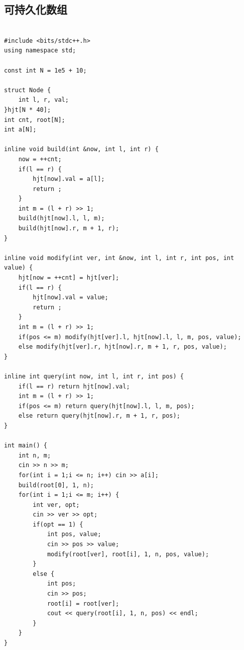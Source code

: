 \documentclass[twoside]{article}
\begin{document}
\subsection{可持久化数组}
\begin{lstlisting}

#include <bits/stdc++.h>
using namespace std;

const int N = 1e5 + 10;

struct Node {
    int l, r, val;
}hjt[N * 40];
int cnt, root[N];
int a[N];

inline void build(int &now, int l, int r) {
    now = ++cnt;
    if(l == r) {
        hjt[now].val = a[l];
        return ;
    }
    int m = (l + r) >> 1;
    build(hjt[now].l, l, m);
    build(hjt[now].r, m + 1, r);
}

inline void modify(int ver, int &now, int l, int r, int pos, int value) {
    hjt[now = ++cnt] = hjt[ver];
    if(l == r) {
        hjt[now].val = value;
        return ;
    }
    int m = (l + r) >> 1;
    if(pos <= m) modify(hjt[ver].l, hjt[now].l, l, m, pos, value);
    else modify(hjt[ver].r, hjt[now].r, m + 1, r, pos, value);
}

inline int query(int now, int l, int r, int pos) {
    if(l == r) return hjt[now].val;
    int m = (l + r) >> 1;
    if(pos <= m) return query(hjt[now].l, l, m, pos);
    else return query(hjt[now].r, m + 1, r, pos); 
}

int main() {
    int n, m;
    cin >> n >> m;
    for(int i = 1;i <= n; i++) cin >> a[i];
    build(root[0], 1, n);
    for(int i = 1;i <= m; i++) {
        int ver, opt;
        cin >> ver >> opt;
        if(opt == 1) {
            int pos, value;
            cin >> pos >> value;
            modify(root[ver], root[i], 1, n, pos, value);
        }
        else {
            int pos;
            cin >> pos;
            root[i] = root[ver];
            cout << query(root[i], 1, n, pos) << endl;
        }
    }
}\end{lstlisting}
\end{document}

